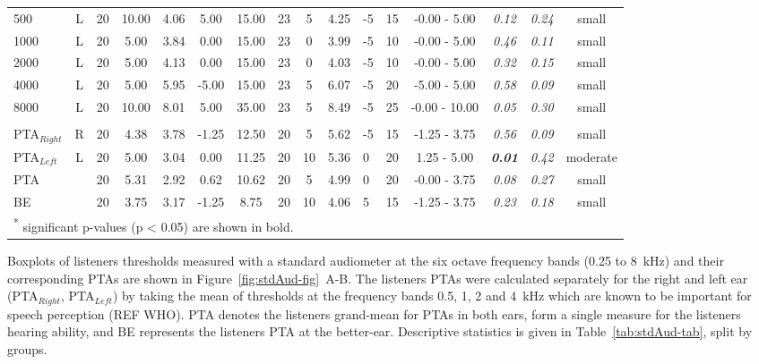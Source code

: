 \documentclass[a4paper, twoside]{templates/ociamthesis}
\begin{document}
\begin{table}
{\begin{tabular}[t]{lcccccc|>{}ccclc|>{}c>{}c>{}cc}
\hspace{1em}500 & L & 20 & 10.00 & 4.06 & 5.00 & 15.00 & 23 & 5 & 4.25 & -5 & 15 & -0.00 - 5.00 & \em{0.12} & \em{0.24} & small\\
\hspace{1em}1000 & L & 20 & 5.00 & 3.84 & 0.00 & 15.00 & 23 & 0 & 3.99 & -5 & 10 & -0.00 - 5.00 & \em{0.46} & \em{0.11} & small\\
\hspace{1em}2000 & L & 20 & 5.00 & 4.13 & 0.00 & 15.00 & 23 & 0 & 4.03 & -5 & 10 & -0.00 - 5.00 & \em{0.32} & \em{0.15} & small\\
\hspace{1em}4000 & L & 20 & 5.00 & 5.95 & -5.00 & 15.00 & 23 & 5 & 6.07 & -5 & 20 & -5.00 - 5.00 & \em{0.58} & \em{0.09} & small\\
\hspace{1em}8000 & L & 20 & 10.00 & 8.01 & 5.00 & 35.00 & 23 & 5 & 8.49 & -5 & 25 & -0.00 - 10.00 & \em{0.05} & \em{0.30} & small\\
\addlinespace[0.3em]
\multicolumn{16}{l}{\textbf{PTAs and better-ear}}\\
\hspace{1em}PTA$_{Right}$ & R & 20 & 4.38 & 3.78 & -1.25 & 12.50 & 20 & 5 & 5.62 & -5 & 15 & -1.25 - 3.75 & \em{0.56} & \em{0.09} & small\\
\hspace{1em}PTA$_{Left}$ & L & 20 & 5.00 & 3.04 & 0.00 & 11.25 & 20 & 10 & 5.36 & 0 & 20 & 1.25 - 5.00 & \em{\textbf{0.01}} & \em{0.42} & moderate\\
\hspace{1em}PTA &  & 20 & 5.31 & 2.92 & 0.62 & 10.62 & 20 & 5 & 4.99 & 0 & 20 & -0.00 - 3.75 & \em{0.08} & \em{0.27} & small\\
\hspace{1em}BE &  & 20 & 3.75 & 3.17 & -1.25 & 8.75 & 20 & 10 & 4.06 & 5 & 15 & -1.25 - 3.75 & \em{0.23} & \em{0.18} & small\\
\bottomrule
\multicolumn{16}{l}{\textsuperscript{*} significant p-values (p < 0.05) are shown in bold.}\\
\end{tabular}}
\end{table}

Boxplots of listeners thresholds measured with a standard audiometer at the six octave frequency bands (0.25 to 8~kHz) and their corresponding PTAs are shown in Figure~\ref{fig:stdAud-fig}~A-B. The listeners PTAs were calculated separately for the right and left ear (PTA\(_{Right}\), PTA\(_{Left}\)) by taking the mean of thresholds at the frequency bands 0.5, 1, 2 and 4~kHz which are known to be important for speech perception (REF WHO). PTA denotes the listeners grand-mean for PTAs in both ears, form a single measure for the listeners hearing ability, and BE represents the listeners PTA at the better-ear. Descriptive statistics is given in Table~\ref{tab:stdAud-tab}, split by groups.
\end{document}
